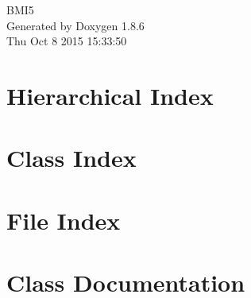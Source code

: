\documentclass[twoside]{book}
\newcommand{\clearemptydoublepage}{%
  \newpage{\pagestyle{empty}\cleardoublepage}%
}
\begin{document}
\hypersetup{pageanchor=false}
\begin{titlepage}
\vspace*{7cm}
\begin{center}%
{\Large B\-M\-I5 }\\
\vspace*{1cm}
{\large Generated by Doxygen 1.8.6}\\
\vspace*{0.5cm}
{\small Thu Oct 8 2015 15:33:50}\\
\end{center}
\end{titlepage}
\clearemptydoublepage
\tableofcontents
\clearemptydoublepage
{}
\hypersetup{pageanchor=true}

\chapter{Hierarchical Index}

\chapter{Class Index}

\chapter{File Index}

\chapter{Class Documentation}






























\end{document}
